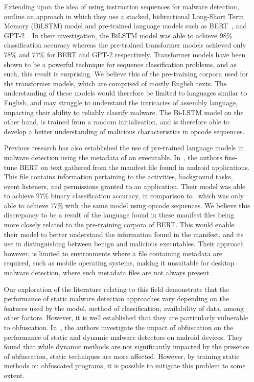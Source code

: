 \documentclass[main.tex]{subfiles}
\begin{document}
Extending upon the idea of using instruction sequences for malware detection,~\citep{demirciStaticMalwareDetection2022} outline an approach in which they use a stacked, bidirectional Long-Short Term Memory (BiLSTM) model and pre-trained language models such as BERT~\citep{devlinBERTPretrainingDeep2019a}, and GPT-2~\citep{radfordLanguageModelsAre2019}. In their investigation, the BiLSTM model was able to achieve 98\% classification accuracy whereas the pre-trained transformer models achieved only 78\% and 77\% for BERT and GPT-2 respectively. Transformer models have been shown to be a powerful technique for sequence classification problems, and as such, this result is surprising. We believe this of the pre-training corpora used for the transformer models, which are comprised of mostly English texts. The understanding of these models would therefore be limited to languages similar to English, and may struggle to understand the intricacies of assembly language, impacting their ability to reliably classify malware. The Bi-LSTM model on the other hand, is trained from a random initialisation, and is therefore able to develop a better understanding of malicious characteristics in opcode sequences.  

Previous research has also established the use of pre-trained language models in malware detection using the metadata of an executable. In~\citep{rahaliMalBERTMalwareDetection2021}, the authors fine-tune BERT on text gathered from the manifest file found in android applications. This file contains information pertaining to the activities, background tasks, event listeners, and permissions granted to an application. Their model was able to achieve 97\% binary classification accuracy, in comparison to~\citep{demirciStaticMalwareDetection2022} which was only able to achieve 77\% with the same model using opcode sequences. We believe this discrepancy to be a result of the language found in these manifest files being more closely related to the pre-training corpora of BERT. This would enable their model to better understand the information found in the manifest, and its use in distinguishing between benign and malicious executables. Their approach however, is limited to environments where a file containing metadata are required, such as mobile operating systems, making it unsuitable for desktop malware detection, where such metadata files are not always present. 

Our exploration of the literature relating to this field demonstrate that the performance of static malware detection approaches vary depending on the features used by the model, method of classification, availability of data, among other factors. However, it is well established that they are particularly vulnerable to obfuscation. In~\cite{bacciImpactCodeObfuscation2018}, the authors investigate the impact of obfuscation on the performance of static and dynamic malware detectors on android devices. They found that while dynamic methods are not significantly impacted by the presence of obfuscation, static techniques are more affected. However, by training static methods on obfuscated programs, it is possible to mitigate this problem to some extent. 
\end{document}
